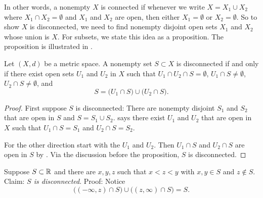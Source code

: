 In other words, a nonempty $X$ is connected if whenever we write
$X = X_1 \cup X_2$ where $X_1 \cap X_2 = \emptyset$ and $X_1$ and $X_2$ are
open, then either $X_1 = \emptyset$ or $X_2 = \emptyset$.
So to show $X$ is disconnected, we need to find nonempty
disjoint open sets $X_1$ and
$X_2$ whose union is $X$.
For subsets, we state this idea as a proposition.
The proposition is illustrated in .

\begin{prop}
Let $(X,d)$ be a metric space.
A nonempty set $S \subset X$ is disconnected if and only if
there exist open sets $U_1$ and
$U_2$ in $X$ such that $U_1 \cap U_2 \cap S = \emptyset$,
$U_1 \cap S \neq \emptyset$,
$U_2 \cap S \neq \emptyset$, and
\begin{equation*}
S = 
\bigl( U_1 \cap S \bigr)
\cup
\bigl( U_2 \cap S \bigr) .
\end{equation*}
\end{prop}

\begin{myfigureht}
\caption{Disconnected subset.  Notice that $U_1 \cap U_2$ need
not be empty, but $U_1 \cap U_2 \cap S = \emptyset$.\label{fig:disconsubset}}
\end{myfigureht}


\begin{proof}
First suppose $S$ is disconnected: There are
nonempty disjoint $S_1$ and $S_2$ that are
open in $S$ and $S = S_1 \cup S_2$.
 says there exist $U_1$ and $U_2$
that are open in $X$ such that $U_1 \cap S = S_1$ and
$U_2 \cap S = S_2$.

For the other direction start with the $U_1$ and $U_2$.
Then $U_1 \cap S$ and $U_2 \cap S$ are open in $S$ by
.
Via the discussion before the proposition, $S$ is disconnected.
\end{proof}

\begin{example}
Suppose $S \subset {\mathbb{R}}$ and there are $x,y,z$ such that $x < z < y$ with $x,y \in S$
and $z \notin S$.  Claim: \emph{$S$ is disconnected}.  Proof:  Notice
\begin{equation*}
\bigl( (-\infty,z) \cap S \bigr)
\cup
\bigl( (z,\infty) \cap S \bigr)
= S .
\end{equation*}
\end{example}

